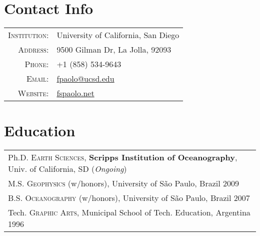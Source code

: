 \documentclass[a4paper,11pt]{article}
\begin{document}
\pagestyle{empty} 



\par{\bigskip\par} %

\section{Contact Info}

\begin{tabular}{rl}
\textsc{Institution:} & University of California, San Diego \\
\textsc{Address:} & 9500 Gilman Dr, La Jolla, 92093 \\
\textsc{Phone:} & +1 (858) 534-9643\\
\textsc{Email:} & \href{mailto:fpaolo@ucsd.edu}{fpaolo@ucsd.edu} \\
\textsc{Website:} & \href{http://fspaolo.net}{fspaolo.net}
\end{tabular}


\section{Education}

\begin{tabular}{l}
Ph.D. \textsc{Earth Sciences}, \textbf{Scripps Institution of Oceanography}, Univ. of California, SD (\emph{Ongoing})\\
M.S. \textsc{Geophysics} (w/honors), University of S\~ao Paulo, Brazil 2009\\
B.S. \textsc{Oceanography} (w/honors), University of S\~ao Paulo, Brazil 2007\\
Tech. \textsc{Graphic Arts}, Municipal School of Tech. Education, Argentina 1996\\
\end{tabular}

\end{document}

